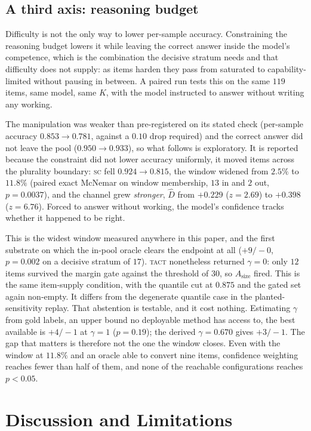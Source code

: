 \documentclass{article}
\newcommand{\Dhat}{\widehat{D}}
\newcommand{\SC}{\textsc{sc}}
\newcommand{\TACT}{\textsc{tact}}
\begin{document}
\subsection{A third axis: reasoning budget}\label{sec:budget}
Difficulty is not the only way to lower per-sample accuracy. Constraining the
reasoning budget lowers it while leaving the correct answer inside the model's
competence, which is the combination the decisive stratum needs and that
difficulty does not supply: as items harden they pass from saturated to
capability-limited without pausing in between. A paired run tests this on the
same $119$ items, same model, same $K$, with the model instructed to answer
without writing any working.

The manipulation was weaker than pre-registered on its stated check
(per-sample accuracy $0.853\to0.781$, against a $0.10$ drop required) and the
correct answer did not leave the pool ($0.950\to0.933$), so what follows is
exploratory. It is reported because the constraint did not lower accuracy
uniformly, it moved items across the plurality boundary: \SC{} fell $0.924\to
0.815$, the window widened from $2.5\%$ to $11.8\%$ (paired exact McNemar on
window membership, $13$ in and $2$ out, $p=0.0037$), and the channel grew
\emph{stronger}, $\Dhat$ from $+0.229$ ($z=2.69$) to $+0.398$ ($z=6.76$).
Forced to answer without working, the model's confidence tracks whether it
happened to be right.

This is the widest window measured anywhere in this paper, and the first
substrate on which the in-pool oracle clears the endpoint at all ($+9/-0$,
$p=0.002$ on a decisive stratum of $17$). \TACT{} nonetheless returned
$\gamma=0$: only $12$ items survived the margin gate against the threshold of
$30$, so $A_{\mathrm{size}}$ fired. This is the same item-supply condition,
with the quantile cut at $0.875$ and the gated set again non-empty. It differs
from the degenerate quantile case in the planted-sensitivity replay. That abstention is testable,
and it cost nothing. Estimating $\gamma$ from gold labels, an upper bound no
deployable method has access to, the best available is $+4/-1$ at $\gamma=1$
($p=0.19$); the derived $\gamma=0.670$ gives $+3/-1$. The gap that matters is
therefore not the one the window closes. Even with the window at $11.8\%$ and
an oracle able to convert nine items, confidence weighting reaches fewer than
half of them, and none of the reachable configurations reaches $p<0.05$.

\section{Discussion and Limitations}\label{sec:limits}
\end{document}
